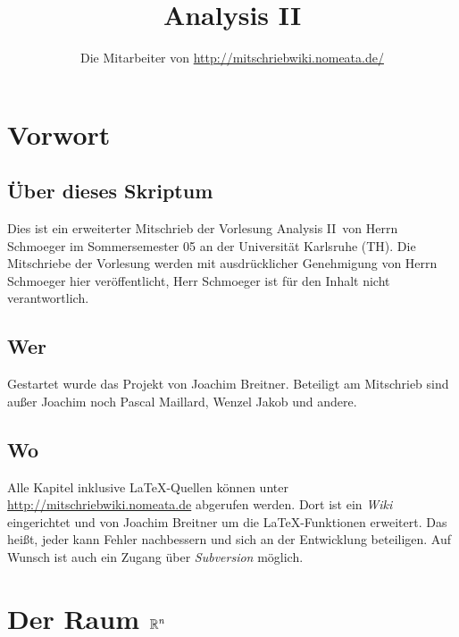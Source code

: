 \documentclass[a4paper,twoside,DIV15,BCOR12mm]{scrbook}
\author{Die Mitarbeiter von \url{http://mitschriebwiki.nomeata.de/}}
\title{Analysis II}
\begin{document}
\maketitle

\renewcommand{\thechapter}{\Roman{chapter}}
\tableofcontents

\chapter{Vorwort}

\section{Über dieses Skriptum}
Dies ist ein erweiterter Mitschrieb der Vorlesung \glqq Analysis II\grqq\ von Herrn Schmoeger im
Sommersemester 05 an der Universität Karlsruhe (TH). Die Mitschriebe der Vorlesung werden mit
ausdrücklicher Genehmigung von Herrn Schmoeger hier veröffentlicht, Herr Schmoeger ist für den
Inhalt nicht verantwortlich.

\section{Wer}
Gestartet wurde das Projekt von Joachim Breitner. Beteiligt am Mitschrieb sind außer Joachim
noch Pascal Maillard, Wenzel Jakob und andere.

\section{Wo}
Alle Kapitel inklusive \LaTeX-Quellen können unter \url{http://mitschriebwiki.nomeata.de} abgerufen werden.
Dort ist ein \emph{Wiki} eingerichtet und von Joachim Breitner um die \LaTeX-Funktionen erweitert.
Das heißt, jeder kann Fehler nachbessern und sich an der Entwicklung
beteiligen. Auf Wunsch ist auch ein Zugang über \emph{Subversion} möglich.


\renewcommand{\thechapter}{\arabic{chapter}}
\renewcommand{\chaptername}{§}
\setcounter{chapter}{0}

\chapter{Der Raum $\mathbb{R}^n$}
\end{document}
